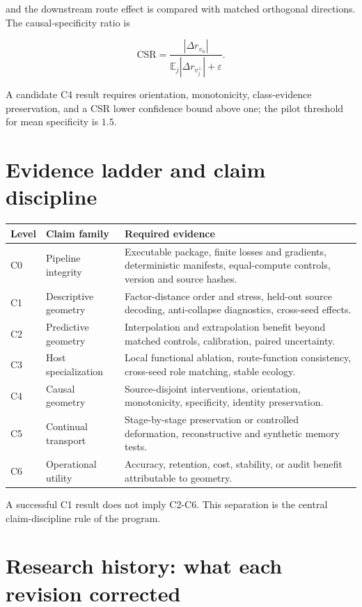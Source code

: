 \documentclass[11pt,a4paper]{article}
\newcommand{\E}{\mathbb{E}}
\begin{document}
and the downstream route effect is compared with matched orthogonal directions. The causal-specificity ratio is

\begin{equation}
 \mathrm{CSR}=\frac{|\Delta r_{v_u}|}{\E_j|\Delta r_{v_j^{\perp}}|+\varepsilon}.
\end{equation}

A candidate C4 result requires orientation, monotonicity, class-evidence preservation, and a CSR lower confidence bound above one; the pilot threshold for mean specificity is $1.5$.

\section{Evidence ladder and claim discipline}

\begin{longtable}{p{}p{}p{}}
\toprule
Level & Claim family & Required evidence \\
\midrule
C0 & Pipeline integrity & Executable package, finite losses and gradients, deterministic manifests, equal-compute controls, version and source hashes. \\
C1 & Descriptive geometry & Factor-distance order and stress, held-out source decoding, anti-collapse diagnostics, cross-seed effects. \\
C2 & Predictive geometry & Interpolation and extrapolation benefit beyond matched controls, calibration, paired uncertainty. \\
C3 & Host specialization & Local functional ablation, route-function consistency, cross-seed role matching, stable ecology. \\
C4 & Causal geometry & Source-disjoint interventions, orientation, monotonicity, specificity, identity preservation. \\
C5 & Continual transport & Stage-by-stage preservation or controlled deformation, reconstructive and synthetic memory tests. \\
C6 & Operational utility & Accuracy, retention, cost, stability, or audit benefit attributable to geometry. \\
\bottomrule
\end{longtable}

A successful C1 result does not imply C2-C6. This separation is the central claim-discipline rule of the program.

\section{Research history: what each revision corrected}
\end{document}
